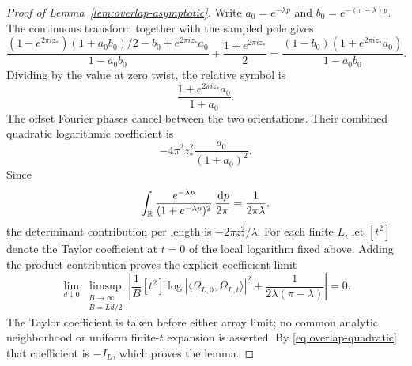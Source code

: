\begin{proof}[Proof of Lemma~\ref{lem:overlap-asymptotic}]
Write \(a_0=e^{-\lambda p}\) and \(b_0=e^{-(\pi-\lambda)p}\).
The continuous transform together with the sampled pole gives
\[
 \frac{(1-e^{2\pi i z_*})(1+a_0b_0)/2-b_0
                              +e^{2\pi i z_*}a_0}
      {1-a_0b_0}
       +\frac{1+e^{2\pi i z_*}}2
 =\frac{(1-b_0)(1+e^{2\pi i z_*}a_0)}
        {1-a_0b_0}.
 \]
Dividing by the value at zero twist, the relative symbol is
\[
 \frac{1+e^{2\pi i z_*}a_0}{1+a_0}.
\]
The offset Fourier phases cancel between the two orientations.
Their combined quadratic logarithmic coefficient is
\[
 -4\pi^2 z_*^2\frac{a_0}{(1+a_0)^2}.
\]
Since
\[
 \int_{\mathbb R}\frac{e^{-\lambda p}}{(1+e^{-\lambda p})^2}\,
       \frac{\,\mathrm d p}{2\pi}=\frac1{2\pi\lambda},
\]
the determinant contribution per length is \(-2\pi z_*^2/\lambda\).
For each finite \(L\), let \([t^2]\) denote the Taylor coefficient at
\(t=0\) of the local logarithm fixed above. Adding the product contribution
proves the explicit coefficient limit
\[
 \lim_{d\downarrow0}\limsup_{\substack{B\to\infty\\ B=Ld/2}}
 \left|\frac1B[t^2]\log|\langle\Omega_{L,0},\Omega_{L,t}\rangle|^2
       +\frac1{2\lambda(\pi-\lambda)}\right|=0.
\]
The Taylor coefficient is taken before either array limit; no common
analytic neighborhood or uniform finite-\(t\) expansion is asserted.
By \eqref{eq:overlap-quadratic} that coefficient is \(-I_L\), which
proves the lemma.
\end{proof}

